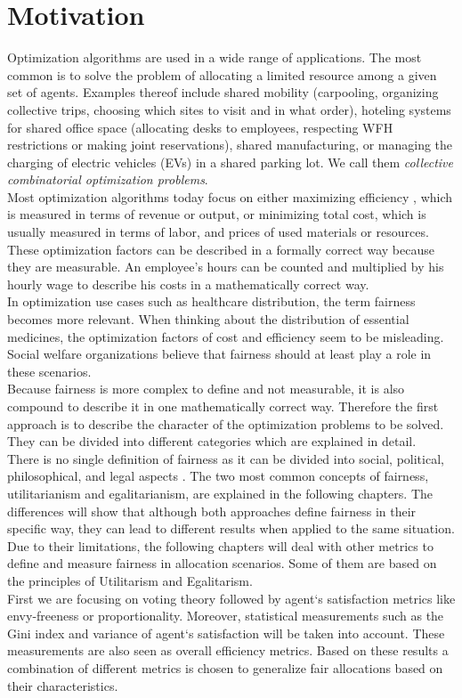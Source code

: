 \documentclass[german, a4paper, 11pt, oneside]{scrbook}
\begin{document}
\chapter{Motivation}
\label{sec:motivation}
Optimization algorithms are used in a wide range of applications. The most common is to solve the problem of allocating a limited resource among a given set of agents.  Examples thereof include shared mobility (carpooling, organizing collective trips, choosing which sites to visit and in what order), hoteling systems for shared office space (allocating desks to employees, respecting WFH restrictions or making joint reservations), shared manufacturing, or managing the charging of electric vehicles (EVs) in a shared parking lot. We call them \emph{collective combinatorial optimization problems}. \\
Most optimization algorithms today focus on either maximizing efficiency \cite{Foulds.7222018}, which is measured in terms of revenue or output, or minimizing total cost, which is usually measured in terms of labor, and prices of used materials or resources. \cite{XinyingChen.2023, .} These optimization factors can be described in a formally correct way because they are measurable. An employee's hours can be counted and multiplied by his hourly wage to describe his costs in a mathematically correct way. \\In optimization use cases such as healthcare distribution, the term fairness becomes more relevant. When thinking about the distribution of essential medicines, the optimization factors of cost and efficiency seem to be misleading. Social welfare organizations believe that fairness should at least play a role in these scenarios.\\ Because fairness is more complex to define and not measurable, it is also compound to describe it in one mathematically correct way. Therefore the first approach is to describe the character of the optimization problems to be solved. They can be divided into different categories which are explained in detail. \\ There is no single definition of fairness as it can be divided into social, political, philosophical, and legal aspects \cite{Foulds.7222018}. The two most common concepts of fairness, utilitarianism and egalitarianism, are explained in the following chapters. The differences will show that although both approaches define fairness in their specific way, they can lead to different results when applied to the same situation. Due to their limitations, the following chapters will deal with other metrics to define and measure fairness in allocation scenarios. Some of them are based on the principles of Utilitarism and Egalitarism. \\ First we are focusing on voting theory followed by agent`s satisfaction metrics like envy-freeness or proportionality. Moreover, statistical measurements such as the Gini index and variance of agent`s satisfaction will be taken into account. These measurements are also seen as overall efficiency metrics. Based on these results a combination of different metrics is chosen to generalize fair allocations based on their characteristics. \cite{Foulds.7222018, XinyingChen.2023, ., Yu.7222022}
\end{document}
